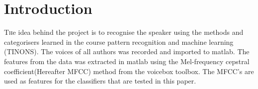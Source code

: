 \section{Introduction}

\lettrine[nindent=0em,lines=3]{T} he idea behind the project is to recognise the speaker using the methods and categorisers learned in the course pattern recognition and machine learning (TINONS). The voices of all authors was recorded and imported to matlab. The features from the data was extracted in matlab using the Mel-frequency cepstral coefficient(Hereafter MFCC) method from the voicebox toolbox. The MFCC's are used as features for the classifiers that are tested in this paper.

